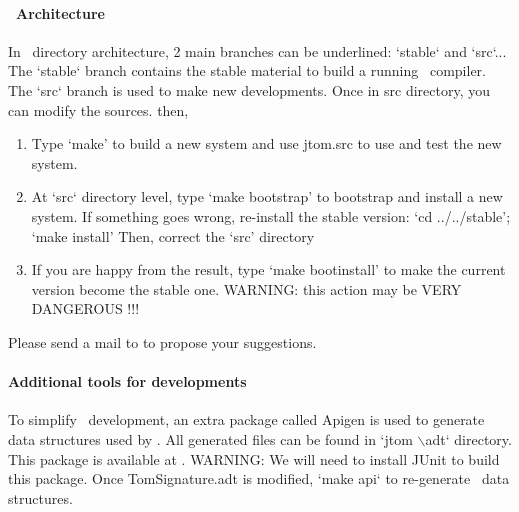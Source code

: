 \paragraph{\TOM\ Architecture}
In \TOM\ directory architecture, 2 main branches can be underlined:
`stable` and `src`...
The `stable` branch contains the stable material to build a running
\TOM\ compiler. The `src` branch is used to make new developments.
Once in src directory, you can modify the sources. then, 
\begin{enumerate}
\item Type `make' to build a new system and use jtom.src to use and
  test the new system.
\item At `src` directory level, type `make bootstrap' to bootstrap and
  install a new system.
  If something goes wrong, re-install the stable version:
  `cd ../../stable'; `make install'
  Then, correct the `src' directory
\item If you are happy from the result, type `make bootinstall' to
  make the current version become the stable one.   WARNING: this action may be VERY DANGEROUS !!!
\end{enumerate}
Please send a mail to  to propose your
suggestions.

\paragraph{Additional tools for developments}
To simplify \TOM\ development, an extra package called Apigen is used
to generate data structures used by \TOM. All generated files can be
found in `jtom $\backslash$adt` directory.
\\This package is available at
.
WARNING: We will need to install JUnit to build this package.
Once TomSignature.adt is modified, `make api` to re-generate \TOM\
data structures.
 
